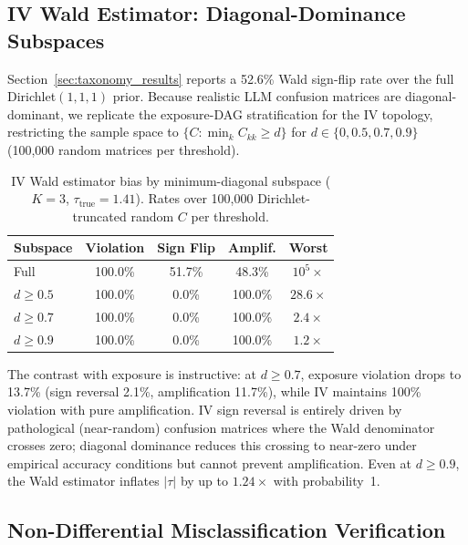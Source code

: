 \subsection{IV Wald Estimator: Diagonal-Dominance Subspaces}
\label{sec:iv_dirichlet_subspace}

Section~\ref{sec:taxonomy_results} reports a 52.6\% Wald sign-flip rate
over the full Dirichlet$(1,1,1)$ prior. Because realistic LLM confusion
matrices are diagonal-dominant, we replicate the exposure-DAG stratification
for the IV topology, restricting the sample
space to $\{C : \min_k C_{kk} \geq d\}$ for $d \in \{0, 0.5, 0.7, 0.9\}$
(100{,}000 random matrices per threshold).

\begin{table}[h]
\centering
\caption{IV Wald estimator bias by minimum-diagonal subspace ($K{=}3$, $\tau_{\text{true}}{=}1.41$).
Rates over 100{,}000 Dirichlet-truncated random $C$ per threshold.}
\label{tab:iv_dirichlet_subspace}
\small
\begin{tabular}{lcccc}
\toprule
\textbf{Subspace} & \textbf{Violation} & \textbf{Sign Flip} & \textbf{Amplif.} & \textbf{Worst} \\
\midrule
Full           & 100.0\% & 51.7\% & 48.3\% & $10^{5}\!\times$ \\
$d \geq 0.5$   & 100.0\% & 0.0\%  & 100.0\% & $28.6\times$ \\
$d \geq 0.7$   & 100.0\% & 0.0\%  & 100.0\% & $2.4\times$ \\
$d \geq 0.9$   & 100.0\% & 0.0\%  & 100.0\% & $1.2\times$ \\
\bottomrule
\end{tabular}
\end{table}

The contrast with exposure is instructive: at $d{\geq}0.7$, exposure violation drops to 13.7\% (sign reversal 2.1\%, amplification 11.7\%), while IV maintains 100\% violation with pure amplification. IV sign reversal is entirely driven by pathological (near-random) confusion matrices where the Wald denominator crosses zero; diagonal dominance reduces this crossing to near-zero under empirical accuracy conditions but cannot prevent amplification. Even at $d{\geq}0.9$, the Wald estimator inflates $|\tau|$ by up to $1.24\times$ with probability~1.

\subsection{Non-Differential Misclassification Verification}
\label{sec:nondiff_verify}

